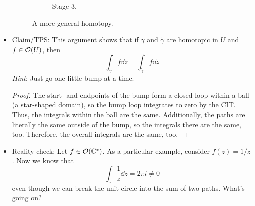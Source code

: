 \documentclass[../notes.tex]{subfiles}
\begin{document}
\begin{itemize}
\begin{figure}[h!]
\begin{subfigure}[b]{0.33\linewidth}
            \caption{Stage 3.}
            \label{fig:homotopicGeneralc}
        \end{subfigure}
        \caption{A more general homotopy.}
        \label{fig:homotopicGeneral}
    \end{figure}
    \item Claim/TPS: This argument shows that if $\gamma$ and $\tilde{\gamma}$ are homotopic in $U$ and $f\in\mathcal{O}(U)$, then
    \begin{equation*}
        \int_\gamma f\dd{z} = \int_{\tilde{\gamma}}f\dd{z}
    \end{equation*}
    \emph{Hint}: Just go one little bump at a time.
    \begin{proof}
        The start- and endpoints of the bump form a closed loop within a ball (a star-shaped domain), so the bump loop integrates to zero by the CIT. Thus, the integrals within the ball are the same. Additionally, the paths are literally the same outside of the bump, so the integrals there are the same, too. Therefore, the overall integrals are the same, too.
    \end{proof}
    \item Reality check: Let $f\in\mathcal{O}(\mathbb{C}^*)$. As a particular example, consider $f(z)=1/z$. Now we know that
    \begin{equation*}
        \int_\circ\frac{1}{z}\dd{z} = 2\pi i \neq 0
    \end{equation*}
    even though we can break the unit circle into the sum of two paths. What's going on?

\end{itemize}
\end{document}
